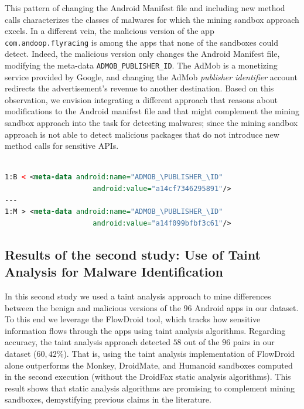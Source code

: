 This pattern of changing the Android Manifest file and including
new method calls characterizes the classes of malwares for which
the mining sandbox approach excels. 
In a different vein, the malicious version of the app
\texttt{com.andoop.flyracing} is among the apps that none of the sandboxes could
detect. Indeed, the malicious version only changes the Android Manifest file,
modifying the meta-data \texttt{ADMOB\_PUBLISHER\_ID}. The AdMob is a monetizing
service provided by Google, and changing the AdMob \emph{publisher identifier} account redirects
the advertisement's revenue to another destination. Based on
this observation, we envision integrating a different approach that reasons
about modifications to the Android manifest file and that might complement the mining sandbox
approach into the task for detecting malwares; since the mining
sandbox approach is not able to detect malicious packages that
do not introduce new method calls for sensitive APIs.

\begin{lstlisting}[caption={Diff in the file \texttt{com.andoop.flyracing}
      AndroidManifest file of the malicious version.
      \texttt{B} stands for
      the benign version, while \texttt{M} stands for the malign version.}, language=XML,
    basicstyle=\fontsize{8}{6}\selectfont\ttfamily,label={lst:app65b}]

1:B < <meta-data android:name="ADMOB_\PUBLISHER_\ID"
                     android:value="a14cf7346295891"/>
---
1:M > <meta-data android:name="ADMOB_\PUBLISHER_\ID"
                     android:value="a14f099bfbf3c61"/>
\end{lstlisting}


\subsection{Results of the second study: Use of Taint Analysis for Malware Identification}\label{sec:res-ss}

In this second study we used a taint analysis approach to mine differences between the
benign and malicious versions of the 96 Android apps in our dataset. To this end we leverage the FlowDroid
tool, which tracks how sensitive information flows through the apps using taint analysis algorithms.
Regarding accuracy, the taint analysis approach detected $58$ out of the $96$ pairs in our dataset ($60,42$\%). That is,
using the taint analysis implementation of FlowDroid alone outperforms the Monkey, DroidMate,
and Humanoid sandboxes computed in the second execution (without the DroidFax static analysis
algorithms). This result shows that static analysis algorithms are promising to complement mining
sandboxes, demystifying previous claims in the literature.

